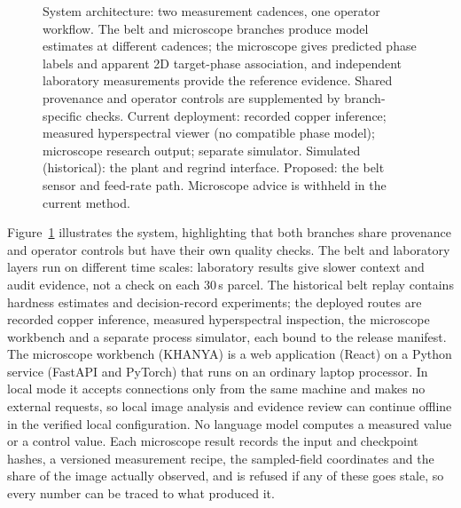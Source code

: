 \documentclass[10pt,a4paper,twocolumn]{article}
\begin{document}
\begin{figure}[t]
\caption{System architecture: two measurement cadences, one operator workflow. The belt and microscope branches produce model estimates at different cadences; the microscope gives predicted phase labels and apparent 2D target-phase association, and independent laboratory measurements provide the reference evidence. Shared provenance and operator controls are supplemented by branch-specific checks. Current deployment: recorded copper inference; measured hyperspectral viewer (no compatible phase model); microscope research output; separate simulator. Simulated (historical): the plant and regrind interface. Proposed: the belt sensor and feed-rate path. Microscope advice is withheld in the current method.}
\label{fig:arch}
\end{figure}

Figure~\ref{fig:arch} illustrates the system, highlighting that both branches share provenance and operator controls but have their own quality checks. The belt and laboratory layers run on different time scales: laboratory results give slower context and audit evidence, not a check on each 30\,s parcel. The historical belt replay contains hardness estimates and decision-record experiments; the deployed routes are recorded copper inference, measured hyperspectral inspection, the microscope workbench and a separate process simulator, each bound to the release manifest. The microscope workbench (KHANYA) is a web application (React) on a Python service (FastAPI and PyTorch) that runs on an ordinary laptop processor. In local mode it accepts connections only from the same machine and makes no external requests, so local image analysis and evidence review can continue offline in the verified local configuration. No language model computes a measured value or a control value. Each microscope result records the input and checkpoint hashes, a versioned measurement recipe, the sampled-field coordinates and the share of the image actually observed, and is refused if any of these goes stale, so every number can be traced to what produced it.
\end{document}
